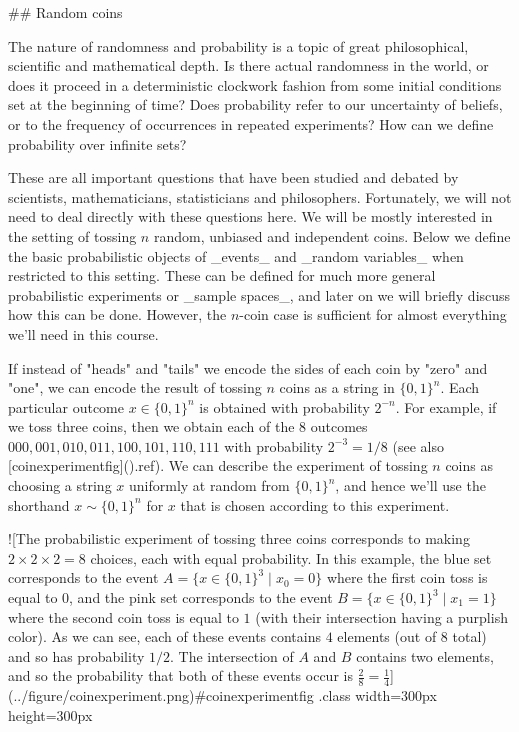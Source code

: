 ## Random coins


The nature of randomness and probability is a topic of great philosophical, scientific and mathematical depth.
Is there actual randomness in the world, or does it proceed in a deterministic clockwork fashion from some  initial conditions set at the beginning of time?
Does probability refer to our uncertainty of beliefs, or to the frequency of occurrences in repeated experiments?
How can we define probability over infinite sets?

These are all important questions that have been studied and debated by  scientists, mathematicians, statisticians and philosophers.
Fortunately, we will not  need to deal directly with these questions here.
We will be mostly interested in the setting of tossing $n$ random, unbiased and independent coins.
Below we define the basic probabilistic objects of _events_ and  _random variables_ when restricted to this setting.
These can be defined for much more general probabilistic experiments or _sample spaces_, and later on we will briefly discuss how this can be done. However, the $n$-coin case is sufficient for almost everything we'll need in this course.

If instead of "heads" and "tails" we encode the sides of each coin by "zero" and "one", we can encode the result of tossing $n$ coins as a string in $\{0,1\}^n$.
Each particular outcome $x\in \{0,1\}^n$ is obtained with probability $2^{-n}$.
For example, if we toss three coins, then we obtain each of the 8 outcomes $000,001,010,011,100,101,110,111$ with probability $2^{-3}=1/8$ (see also [coinexperimentfig](){.ref}).
We can  describe the experiment of tossing $n$ coins as choosing a string $x$ uniformly at random from $\{0,1\}^n$, and hence we'll use the shorthand $x\sim \{0,1\}^n$ for $x$ that is chosen according to this experiment.

![The probabilistic experiment of tossing three coins corresponds  to making $2\times 2 \times 2 = 8$ choices, each with equal probability. In this example, the blue set corresponds to the event $A = \{ x\in \{0,1\}^3 \;|\; x_0 = 0 \}$ where the first coin toss is equal to $0$,  and the pink set corresponds to the event $B = \{ x\in \{0,1\}^3 \;|\; x_1 = 1 \}$ where the second coin toss is equal to $1$ (with their intersection having a purplish color). As we can see, each of these events contains $4$ elements (out of $8$ total) and so has probability $1/2$. The intersection of $A$ and $B$ contains two elements, and so the probability that both of these events occur is $\tfrac{2}{8}=\tfrac{1}{4}$](../figure/coinexperiment.png){#coinexperimentfig .class width=300px height=300px}

